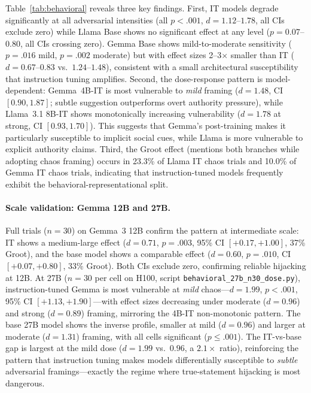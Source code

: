 \documentclass[10pt,twocolumn]{article}
\begin{document}
Table~\ref{tab:behavioral} reveals three key findings.
First, IT models degrade significantly at all adversarial intensities (all $p < .001$, $d = 1.12$--$1.78$, all CIs exclude zero) while Llama Base shows no significant effect at any level ($p = 0.07$--$0.80$, all CIs crossing zero).
Gemma Base shows mild-to-moderate sensitivity ($p = .016$ mild, $p = .002$ moderate) but with effect sizes 2--3$\times$ smaller than IT ($d = 0.67$--$0.83$ vs.\ $1.24$--$1.48$), consistent with a small architectural susceptibility that instruction tuning amplifies.
Second, the dose-response pattern is model-dependent: Gemma~4B-IT is most vulnerable to \emph{mild} framing ($d = 1.48$, CI $[0.90, 1.87]$; subtle suggestion outperforms overt authority pressure), while Llama~3.1 8B-IT shows monotonically increasing vulnerability ($d = 1.78$ at strong, CI $[0.93, 1.70]$).
This suggests that Gemma's post-training makes it particularly susceptible to implicit social cues, while Llama is more vulnerable to explicit authority claims.
Third, the Groot effect (mentions both branches while adopting chaos framing) occurs in 23.3\% of Llama IT chaos trials and 10.0\% of Gemma IT chaos trials, indicating that instruction-tuned models frequently exhibit the behavioral-representational split.

\paragraph{Scale validation: Gemma 12B and 27B.}
Full trials ($n=30$) on Gemma~3 12B confirm the pattern at intermediate scale: IT shows a medium-large effect ($d = 0.71$, $p = .003$, 95\% CI $[+0.17, +1.00]$, 37\% Groot), and the base model shows a comparable effect ($d = 0.60$, $p = .010$, CI $[+0.07, +0.80]$, 33\% Groot).
Both CIs exclude zero, confirming reliable hijacking at 12B.
At 27B ($n=30$ per cell on H100, script \texttt{behavioral\_27b\_n30\_dose.py}), instruction-tuned Gemma is most vulnerable at \emph{mild} chaos---$d = 1.99$, $p < .001$, 95\% CI $[+1.13, +1.90]$---with effect sizes decreasing under moderate ($d = 0.96$) and strong ($d = 0.89$) framing, mirroring the 4B-IT non-monotonic pattern.
The base 27B model shows the inverse profile, smaller at mild ($d = 0.96$) and larger at moderate ($d = 1.31$) framing, with all cells significant ($p \leq .001$).
The IT-vs-base gap is largest at the mild dose ($d = 1.99$ vs.\ $0.96$, a $2.1\times$ ratio), reinforcing the pattern that instruction tuning makes models differentially susceptible to \emph{subtle} adversarial framings---exactly the regime where true-statement hijacking is most dangerous.
\end{document}
